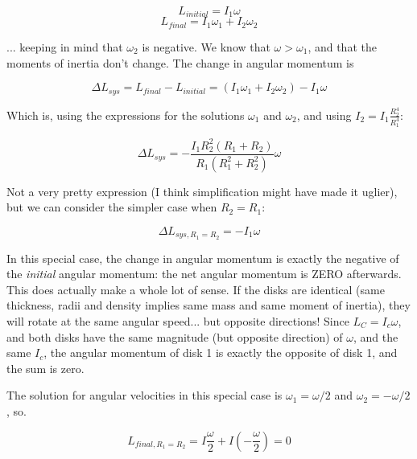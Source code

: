 \documentclass[8.01x]{subfiles}
\begin{document}
\begin{equation}
L_{initial} = I_1 \omega
\end{equation}
\begin{equation}
L_{final} = I_1 \omega_1 + I_2 \omega_2
\end{equation}

... keeping in mind that $\omega_2$ is negative. We know that $\omega > \omega_1$, and that the moments of inertia don't change. The change in angular momentum is

\begin{equation}
\Delta L_{sys} = L_{final} - L_{initial} =  (I_1 \omega_1 + I_2 \omega_2) - I_1 \omega
\end{equation}

Which is, using the expressions for the solutions $\omega_1$ and $\omega_2$, and using $\displaystyle I_2 = I_1 \frac{R_2^4}{R_1^4}$:

\begin{equation}
\Delta L_{sys} = -\frac{I_1 R_2^2 (R_1 + R_2)}{R_1 (R_1^2 + R_2^2)} \omega
\end{equation}

Not a very pretty expression (I think simplification might have made it uglier), but we can consider the simpler case when $R_2 = R_1$:

\begin{equation}
\Delta L_{sys,R_1=R_2} = -I_1 \omega
\end{equation}

In this special case, the change in angular momentum is exactly the negative of the \emph{initial} angular momentum: the net angular momentum is ZERO afterwards.\\
This does actually make a whole lot of sense. If the disks are identical (same thickness, radii and density implies same mass and same moment of inertia), they will rotate at the same angular speed... but opposite directions! Since $L_C = I_c \omega$, and both disks have the same magnitude (but opposite direction) of $\omega$, and the same $I_c$, the angular momentum of disk 1 is exactly the opposite of disk 1, and the sum is zero.

The solution for angular velocities in this special case is $\omega_1 = \omega/2$ and $\omega_2 = -\omega/2$, so.

\begin{equation}
L_{final,R_1=R_2} = I \frac{\omega}{2} + I \left(-\frac{\omega}{2}\right) = 0
\end{equation}
\end{document}
